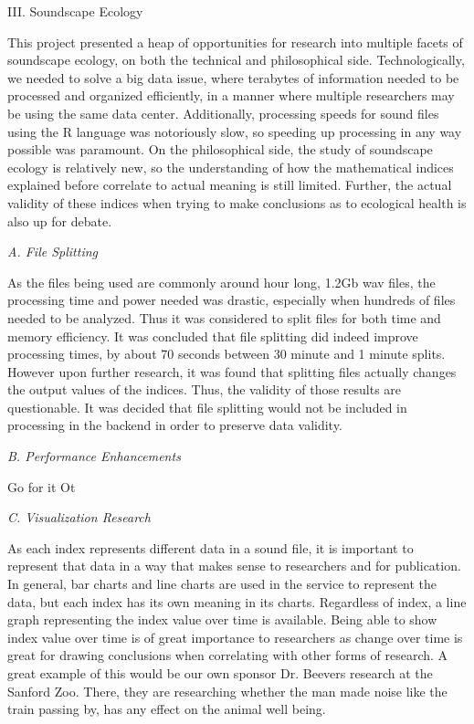 \begin{center}
III. Soundscape Ecology
\end{center}
\begin{flushleft}
\setlength{\parindent}{0.125in}
This project presented a heap of opportunities for research into multiple facets of soundscape ecology, on both the technical and philosophical side. Technologically, we needed to solve a big data issue, where terabytes of information needed to be processed and organized efficiently, in a manner where multiple researchers may be using the same data center. Additionally, processing speeds for sound files using the R language was notoriously slow, so speeding up processing in any way possible was paramount. On the philosophical side, the study of soundscape ecology is relatively new, so the understanding of how the mathematical indices explained before correlate to actual meaning is still limited. Further, the actual validity of these indices when trying to make conclusions as to ecological health is also up for debate.\par

\noindent\textit{A. File Splitting}\par
As the files being used are commonly around hour long, 1.2Gb wav files, the processing time and power needed was drastic, especially when hundreds of files needed to be analyzed. Thus it was considered to split files for both time and memory efficiency. It was concluded that file splitting did indeed improve processing times, by about 70 seconds between 30 minute and 1 minute splits. However upon further research, it was found that splitting files actually changes the output values of the indices. Thus, the validity of those results are questionable. It was decided that file splitting would not be included in processing in the backend in order to preserve data validity.\par

\noindent\textit{B. Performance Enhancements}\par
Go for it Ot\par

\noindent\textit{C. Visualization Research}\par
As each index represents different data in a sound file, it is important to represent that data in a way that makes sense to researchers and for publication. In general, bar charts and line charts are used in the service to represent the data, but each index has its own meaning in its charts. Regardless of index, a line graph representing the index value over time is available. Being able to show index value over time is of great importance to researchers as change over time is great for drawing conclusions when correlating with other forms of research. A great example of this would be our own sponsor Dr. Beever\textquotesingle s research at the Sanford Zoo. There, they are researching whether the man made noise like the train passing by, has any effect on the animal well being.

\end{flushleft}
